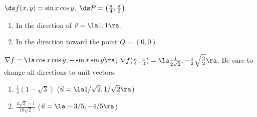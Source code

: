{$\ds f(x,y) = \sin x\cos y$, $\ds P = \left(\frac{\pi}{4},\frac{\pi}{3}\right)$
\begin{enumerate}
	\item In the direction of $\vec v=\la 1,1\ra$.
	\item	In the direction toward the point $Q = (0,0)$.
\end{enumerate}
}
{$\nabla f = \la \cos x\cos y, -\sin x\sin y\ra$; $\nabla f(\frac{\pi}{4},\frac{\pi}{3}) = \la \frac{1}{2\sqrt{2}},-\frac12\sqrt{\frac32}\ra$. Be sure to change all directions to unit vectors. 
\begin{enumerate}
	\item $\frac14(1-\sqrt{3})$ ($\vec u = \la 1/\sqrt{2},1/\sqrt{2}\ra$)
	\item	$\frac{4\sqrt{3}-1}{10\sqrt{2}}$ ($\vec u = \la -3/5,-4/5\ra$)
\end{enumerate}
}